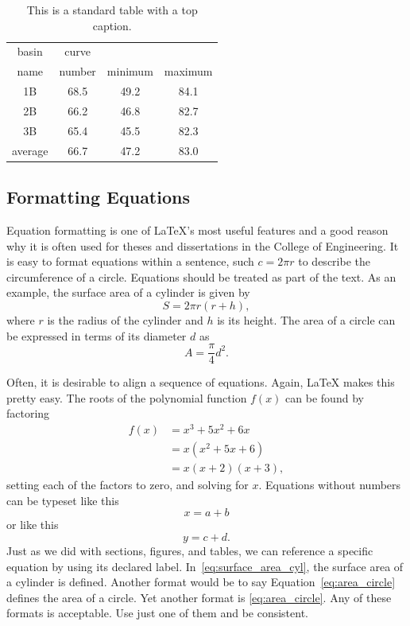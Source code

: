 \begin{table}
	\centering
	\begin{tabular}{ c c c c}
		\toprule
		basin & curve \\
		name & number & minimum & maximum \\
		\midrule
		1B & 68.5 & 49.2 & 84.1 \\ 
		2B & 66.2 & 46.8 & 82.7\\ 
		3B & 65.4 & 45.5 & 82.3\\
		\midrule
		average & 66.7 & 47.2 & 83.0\\
		\bottomrule
	\end{tabular}
	\caption{This is a standard table with a top caption.}
	\label{tab:table_example}
\end{table}

\subsection{Formatting Equations}
Equation formatting is one of \LaTeX's most useful features and a good reason why it is often used for theses and dissertations in the College of Engineering. It is easy to format equations within a sentence, such $c = 2 \pi r$ to describe the circumference of a circle. Equations should be treated as part of the text. As an example, the surface area of a cylinder is given by
\begin{equation}
	\label{eq:surface_area_cyl}
	S = 2\pi r \left( r + h \right) ,
\end{equation}
where $r$ is the radius of the cylinder and $h$ is its height. The area of a circle can be expressed in terms of its diameter $d$ as 
\begin{equation}
	\label{eq:area_circle}
	A = \frac{\pi}{4} d^2 .
\end{equation}

Often, it is desirable to align a sequence of equations. Again, \LaTeX{} makes this pretty easy. The roots of the polynomial function $f(x)$ can be found by factoring
\begin{align}
	f(x) &= x^3 + 5x^2 + 6x \\
		 & = x (x^2 + 5x + 6) \\
		 & = x (x + 2)(x +3) ,
\end{align}
setting each of the factors to zero, and solving for $x$. Equations without numbers can be typeset like this
\[
	x = a + b
\]
or like this
\begin{equation*}
	y = c + d .
\end{equation*}
Just as we did with sections, figures, and tables, we can reference a specific equation by using its declared label. In~\eqref{eq:surface_area_cyl}, the surface area of a cylinder is defined. Another format would be to say Equation~\ref{eq:area_circle} defines the area of a circle. Yet another format is \cref{eq:area_circle}. Any of these formats is acceptable. Use just one of them and be consistent.
